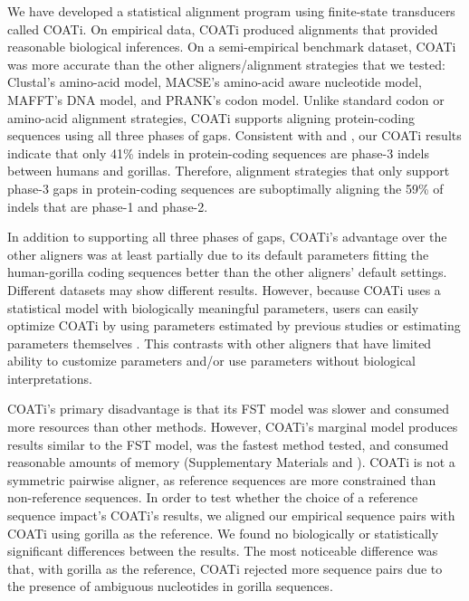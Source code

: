 \documentclass[12pt,letterpaper]{article}
\begin{document}
We have developed a statistical alignment program using finite-state transducers called COATi. On empirical data, COATi produced alignments that provided reasonable biological inferences. On a semi-empirical benchmark dataset, COATi was more accurate than the other aligners/alignment strategies that we tested: Clustal\textOmega{}'s amino-acid model, MACSE's amino-acid aware nucleotide model, MAFFT's DNA model, and PRANK's codon model. Unlike standard codon or amino-acid alignment strategies, COATi supports aligning protein-coding sequences using all three phases of gaps. Consistent with \cite{taylor2004occurrence} and \cite{zhu2022profiling}, our COATi results indicate that only 41\% indels in protein-coding sequences are phase-3 indels between humans and gorillas. Therefore, alignment strategies that only support phase-3 gaps in protein-coding sequences are suboptimally aligning the 59\% of indels that are phase-1 and phase-2.

In addition to supporting all three phases of gaps, COATi's advantage over the other aligners was at least partially due to its default parameters fitting the human-gorilla coding sequences better than the other aligners' default settings. Different datasets may show different results. However, because COATi uses a statistical model with biologically meaningful parameters, users can easily optimize COATi by using parameters estimated by previous studies or estimating parameters themselves \citep[e.g.][]{zhu2022profiling}. This contrasts with other aligners that have limited ability to customize parameters and/or use parameters without biological interpretations.

COATi's primary disadvantage is that its FST model was slower and consumed more resources than other methods. However, COATi's marginal model produces results similar to the FST model, was the fastest method tested, and consumed reasonable amounts of memory (Supplementary Materials and \citealt{garcia2023dissertation}).
%
COATi is not a symmetric pairwise aligner, as reference sequences are more constrained than non-reference sequences. In order to test whether the choice of a reference sequence impact's COATi's results, we aligned our empirical sequence pairs with COATi using gorilla as the reference. We found no biologically or statistically significant differences between the results. The most noticeable difference was that, with gorilla as the reference, COATi rejected more sequence pairs due to the presence of ambiguous nucleotides in gorilla sequences.
\end{document}
